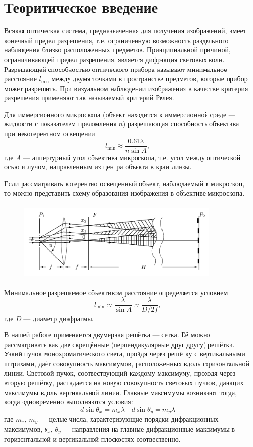 \documentclass[12pt]{article}
\begin{document}
\section*{Теоритическое введение}
\par
	Всякая оптическая система, предназначенная для получения изображений, имеет конечный предел разрешения, т.е. ограниченную возможность раздельного наблюдения близко расположенных предметов. Принципиальной причиной, ограничивающей предел разрешения, является дифракция световых волн. Разрешающей способностью оптического прибора называют минимальное расстояние $l_\text{min}$ между двумя точками в пространстве предметов, которые прибор может разрешить. При визуальном наблюдении изображения в качестве критерия разрешения применяют так называемый критерий Релея.
\par
	Для иммерсионного микроскопа (объект находится в иммерсионной среде --- жидкости с показателем преломления $n$) разрешающая способность объектива при некогерентном освещении
\[
	l_\text{min} \approx \frac{0.61 \lambda}{n \sin A},
\]
где $A$ --- аппертурный угол объектива микроскопа, т.е. угол между оптической осью и лучом, направленным из центра объекта в край линзы.
\par
	Если рассматривать когерентно освещенный объект, наблюдаемый в микроскоп, то можно представить схему образования изображения в объективе микроскопа.
\begin{figure}[h!]
	\centering
	\includegraphics[width = 10cm, height = 4cm]{image2.png}
\end{figure}
\par
	Минимальное разрешаемое объективом расстояние определяется условием
\[
	l_\text{min} \approx \frac{\lambda}{\sin A} \approx \frac{\lambda}{D / 2f},
\]
где $D$ --- диаметр диафрагмы.
\par
	В нашей работе применяется двумерная решётка --- сетка. Её можно рассматривать как две скрещённые (перпендикулярные друг другу) решётки. Узкий пучок монохроматического света, пройдя через решётку с вертикальными штрихами, даёт совокупность максимумов, расположенных вдоль горизонтальной линии. Световой пучок, соотвествующий каждому максимуму, проходя через вторую решётку, распадается на новую совокупность световых пучков, дающих максимумы вдоль вертикальной линии. Главные максимумы возникают тогда, когда одновременно выполняются условия:
\[
	d \sin \theta_x = m_x \lambda \quad d \sin \theta_y = m_y \lambda
\]
где $m_x$, $m_y$ --- целые числа, характеризующие порядки дифракционных максимумов, $\theta_x$, $\theta_y$ --- направления на главные дифракционные максимумы в горизонтальной и вертикальной плоскостях соотвественно.
\end{document}
